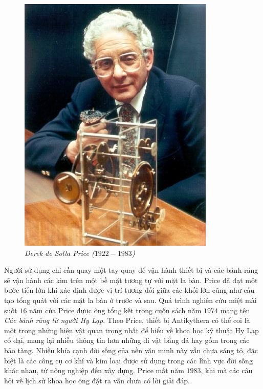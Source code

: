 \begin{multicols}{2}
	\begin{figure}[H]
		\vspace*{-5pt}
		\centering
		\captionsetup{labelformat= empty, justification=centering}
		\includegraphics[width= 0.72\linewidth]{3}
		\caption{\small\textit{\color{lichsutoanhoc}Derek de Solla Price ($1922-1983$)}}
		\vspace*{-5pt}
	\end{figure}
	Người sử dụng chỉ cần quay một tay quay để vận hành thiết bị và các bánh răng sẽ vận hành các kim trên một bề mặt tương tự với mặt la bàn. Price đã đạt một bước tiến lớn khi xác định được vị trí tương đối giữa các khối lớn cũng như cấu tạo tổng quát với các mặt la bàn ở trước và sau. Quá trình nghiên cứu miệt mài suốt $16$ năm của Price được ông tổng kết trong cuốn sách năm $1974$ mang tên \textit{Các bánh răng từ người Hy Lạp}. Theo Price, thiết bị Antikythera có thể coi là một trong những hiện vật quan trọng nhất để hiểu về khoa học kỹ thuật Hy Lạp cổ đại, mang lại nhiều thông tin hơn những di vật bằng đá hay gốm trong các bảo tàng. Nhiều khía cạnh đời sống của nền văn minh này vẫn chưa sáng tỏ, đặc biệt là các công cụ cơ khí và kim loại được sử dụng trong các lĩnh vực đời sống khác nhau, từ nông nghiệp đến xây dựng. Price mất năm $1983$, khi mà các câu hỏi về lịch sử khoa học ông đặt ra vẫn chưa có lời giải đáp. 
	\begin{figure}[H]
		\vspace*{-5pt}

\end{figure}
\end{multicols}
